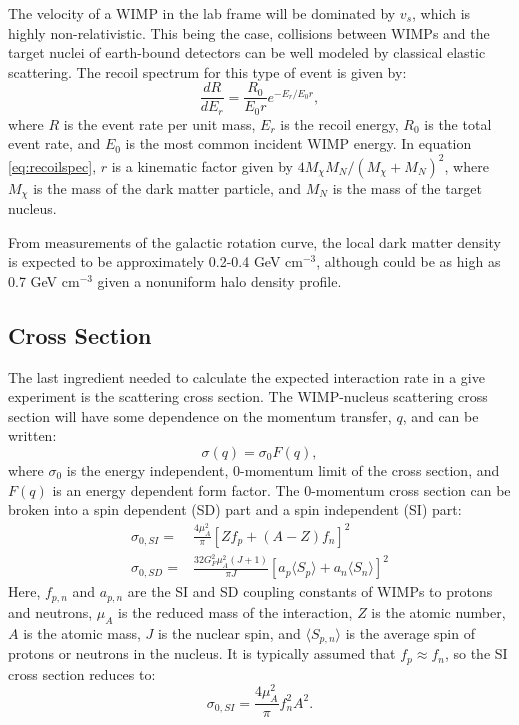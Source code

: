 The velocity of a WIMP in the lab frame will be dominated by $v_s$, which is highly non-relativistic. This being the case, collisions between WIMPs and the target nuclei of earth-bound detectors can be well modeled by classical elastic scattering. The recoil spectrum for this type of event is given by:
\begin{equation} \label{eq:recoilspec}
\frac{dR}{dE_{r}}=\frac{R_{0}}{E_{0}r}e^{-E_{r}/E_{0}r},
\end{equation}
where $R$ is the event rate per unit mass, $E_{r}$ is the recoil energy, $R_{0}$ is the total event rate, and $E_{0}$ is the most common incident WIMP energy. In equation \ref{eq:recoilspec}, $r$ is a kinematic factor given by $4M_{\chi}M_{N}/(M_{\chi}+M_{N})^2$, where $M_{\chi}$ is the mass of the dark matter particle, and $M_{N}$ is the mass of the target nucleus. 

From measurements of the galactic rotation curve, the local dark matter density is expected to be approximately 0.2-0.4 GeV cm$^{-3}$, although could be as high as 0.7 GeV cm$^{-3}$ given a nonuniform halo density profile\cite{weber}. 


\subsection{Cross Section}
The last ingredient needed to calculate the expected interaction rate in a give experiment is the scattering cross section. The WIMP-nucleus scattering cross section will have some dependence on the momentum transfer, $q$, and can be written\cite{dmintro}:
\begin{equation}
\sigma(q)=\sigma_0F(q),
\end{equation}
where $\sigma_0$ is the energy independent, 0-momentum limit of the cross section, and $F(q)$ is an energy dependent form factor. The 0-momentum cross section can be broken into a spin dependent (SD) part and a spin independent (SI) part\cite{wimp_nucleon,dmintro}:
\begin{equation}\label{eq:sisd_cs}
\begin{split}
\sigma_{0,SI}=& \frac{4\mu_A^2}{\pi}[Zf_p+(A-Z)f_n]^2 \\
\sigma_{0,SD}=& \frac{32G_F^2\mu_A^2(J+1)}{\pi J}[a_p\langle S_p \rangle + a_n\langle S_n \rangle ]^2
\end{split}
\end{equation} 
Here, $f_{p,n}$ and $a_{p,n}$ are the SI and SD coupling constants of WIMPs to protons and neutrons, $\mu_A$ is the reduced mass of the interaction, $Z$ is the atomic number, $A$ is the atomic mass, $J$ is the nuclear spin, and $\langle S_{p,n} \rangle$ is the average spin of protons or neutrons in the nucleus. It is typically assumed that $f_p \approx f_n$, so the SI cross section reduces to:
\begin{equation}\label{eq:sics}
\sigma_{0,SI}= \frac{4\mu_A^2}{\pi}f_n^2A^2. 
\end{equation} 

